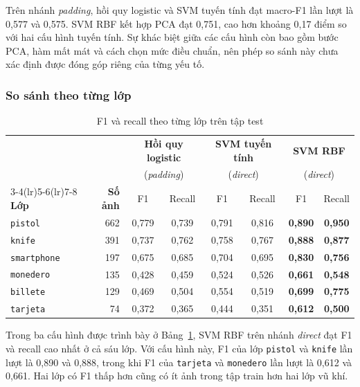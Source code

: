 Trên nhánh \emph{padding}, hồi quy logistic và SVM tuyến tính đạt macro-F1 lần lượt là 0,577 và 0,575. SVM RBF kết hợp PCA đạt 0,751, cao hơn khoảng 0,17 điểm so với hai cấu hình tuyến tính. Sự khác biệt giữa các cấu hình còn bao gồm bước PCA, hàm mất mát và cách chọn mức điều chuẩn, nên phép so sánh này chưa xác định được đóng góp riêng của từng yếu tố.

\subsubsection{So sánh theo từng lớp}

\begin{table}[H]
\centering
\caption{F1 và recall theo từng lớp trên tập test}
\label{tab:per_class}
\small
\setlength{\tabcolsep}{4pt}
\begin{tabular}{@{}lr cc cc cc@{}}
\toprule
 & & \multicolumn{2}{c}{\textbf{Hồi quy logistic}} & \multicolumn{2}{c}{\textbf{SVM tuyến tính}} & \multicolumn{2}{c}{\textbf{SVM RBF}} \\
 & & \multicolumn{2}{c}{(\emph{padding})} & \multicolumn{2}{c}{(\emph{direct})} & \multicolumn{2}{c}{(\emph{direct})} \\
\cmidrule(lr){3-4}\cmidrule(lr){5-6}\cmidrule(lr){7-8}
\textbf{Lớp} & \textbf{Số ảnh} & F1 & Recall & F1 & Recall & F1 & Recall \\
\midrule
\texttt{pistol}     & 662 & 0,779 & 0,739 & 0,791 & 0,816 & \textbf{0,890} & \textbf{0,950} \\
\texttt{knife}      & 391 & 0,737 & 0,762 & 0,758 & 0,767 & \textbf{0,888} & \textbf{0,877} \\
\texttt{smartphone} & 197 & 0,675 & 0,685 & 0,704 & 0,695 & \textbf{0,830} & \textbf{0,756} \\
\texttt{monedero}   & 135 & 0,428 & 0,459 & 0,524 & 0,526 & \textbf{0,661} & \textbf{0,548} \\
\texttt{billete}    & 129 & 0,469 & 0,504 & 0,554 & 0,519 & \textbf{0,699} & \textbf{0,775} \\
\texttt{tarjeta}    &  74 & 0,372 & 0,365 & 0,444 & 0,351 & \textbf{0,612} & \textbf{0,500} \\
\bottomrule
\end{tabular}
\end{table}

Trong ba cấu hình được trình bày ở Bảng~\ref{tab:per_class}, SVM RBF trên nhánh \emph{direct} đạt F1 và recall cao nhất ở cả sáu lớp. Với cấu hình này, F1 của lớp \texttt{pistol} và \texttt{knife} lần lượt là 0,890 và 0,888, trong khi F1 của \texttt{tarjeta} và \texttt{monedero} lần lượt là 0,612 và 0,661. Hai lớp có F1 thấp hơn cũng có ít ảnh trong tập train hơn hai lớp vũ khí.

